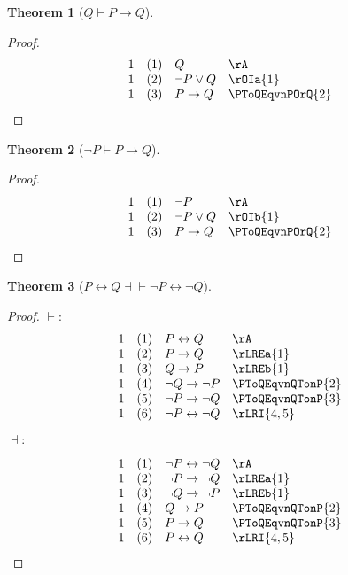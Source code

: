 \documentclass{book}
\theoremstyle{plain}
\newtheorem{theorem}{Theorem}
\theoremstyle{remark}
\theoremstyle{definition}
\begin{document}
\label{QImpPToQ}
\begin{theorem}[\(Q \vdash P \rightarrow Q\)]
\end{theorem}
\begin{proof}
	\[
	\begin{array}{llll}
		1 & (1) & Q & \rA \\
		1 & (2) & \neg P \lor Q & \rOIa{1} \\
		1 & (3) & P\rightarrow Q & \PToQEqvnPOrQ{2} \\
	\end{array}
	\]
\end{proof}

\label{nPImpPToQ}
\begin{theorem}[\(\neg P \vdash P \rightarrow Q\)]
\end{theorem}
\begin{proof}
	\[
	\begin{array}{llll}
		1 & (1) & \neg P & \rA \\
		1 & (2) & \neg P \lor Q & \rOIb{1} \\
		1 & (3) & P\rightarrow Q & \PToQEqvnPOrQ{2} \\
	\end{array}
	\]
\end{proof}

\label{PLrQEqvnPLrnQ}
\begin{theorem}[\(P \leftrightarrow Q \dashv \vdash \neg P \leftrightarrow \neg Q\)]
\end{theorem}
\begin{proof}
	\(\vdash:\)
	\[
	\begin{array}{llll}
		1 & (1) & P \leftrightarrow Q & \rA \\
		1 & (2) & P \rightarrow Q & \rLREa{1} \\
		1 & (3) & Q \rightarrow P & \rLREb{1} \\
		1 & (4) & \neg Q \rightarrow \neg P & \PToQEqvnQTonP{2} \\
		1 & (5) & \neg P \rightarrow \neg Q & \PToQEqvnQTonP{3} \\
		1 & (6) & \neg P \leftrightarrow \neg Q & \rLRI{4,5} \\
	\end{array}
	\]
	
	\(\dashv:\)
	
	\[
	\begin{array}{llll}
		1 & (1) & \neg P \leftrightarrow \neg Q & \rA \\
		1 & (2) & \neg P \rightarrow \neg Q & \rLREa{1} \\
		1 & (3) & \neg Q \rightarrow \neg P & \rLREb{1} \\
		1 & (4) & Q \rightarrow P & \PToQEqvnQTonP{2} \\
		1 & (5) & P \rightarrow Q & \PToQEqvnQTonP{3} \\
		1 & (6) & P \leftrightarrow Q & \rLRI{4,5} \\
	\end{array}
	\]
\end{proof}
\end{document}

